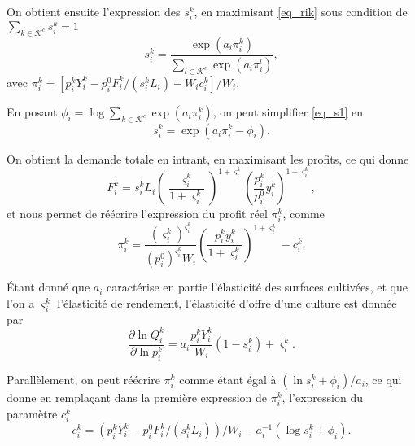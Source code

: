On obtient ensuite l’expression des $s_i^k$, en maximisant \ref{eq_rik} sous condition de $\sum_{k\in \mathcal{K}^c} s_i^k = 1$
\begin{equation}\label{eq_s1}
    s_i^k = \frac{\exp(a_i \pi_i^k)}{\sum_{l \in \mathcal{K}^c} \exp(a_i \pi_i^l)},
\end{equation}
avec $\pi_i^k = [p_i^k Y_i^k - p_i^0 F_i^k/(s_i^k L_i) - W_i c_i^k]/W_i$.

En posant $\phi_i = \log \sum_{k \in \mathcal{K}^c} \exp(a_i \pi_i^k)$, on peut simplifier \ref{eq_s1} en
\begin{equation}\label{eq_sik}
    s_i^k = \exp(a_i \pi_i^k - \phi_i).
\end{equation}

On obtient la demande totale en intrant, en maximisant les profits, ce qui donne
\begin{equation}
    F_i^k = s_i^k L_i \left( \frac{\varsigma_i^k}{1+\varsigma_i^k} \right)^{1+\varsigma_i^k} \left( \frac{p_i^k}{p_i^0} y_i^k \right)^{1+\varsigma_i^k},
\end{equation}
et nous permet de réécrire l’expression du profit réel $\pi_i^k$, comme
\begin{equation}
    \pi_i^k = \frac{\left( \varsigma_i^k \right)^{\varsigma_i^k}}{\left(  p_i^0 \right)^{\varsigma_i^k}W_i} \left( \frac{p_i^k y_i^k}{1+\varsigma_i^k }\right)^{1+\varsigma_i^k} - c_i^k.
\end{equation}

Étant donné que $a_i$ caractérise en partie l’élasticité des surfaces cultivées, et que l’on a $\varsigma_i^k$ l’élasticité de rendement, l'élasticité d'offre d'une culture est donnée par
\begin{equation*}
    \frac{\partial \ln Q_i^k}{\partial \ln p_i^k} = a_i \frac{p_i^k Y_i^k}{W_i}(1 - s_i^k) + \varsigma_i^k.
\end{equation*}

Parallèlement, on peut réécrire $\pi_i^k$ comme étant égal à $(\ln s_i^k + \phi_i)/a_i$, ce qui donne en remplaçant dans la première expression de $\pi_i^k$, l'expression du paramètre $c_i^k$
\begin{equation*}
    c_i^k = \left( p_i^k Y_i^k - p_i^0 F_i^k / \left( s_i^k L_i \right) \right) / W_i - a_i^{-1} \left( \log s_i^k + \phi_i \right).
\end{equation*}

